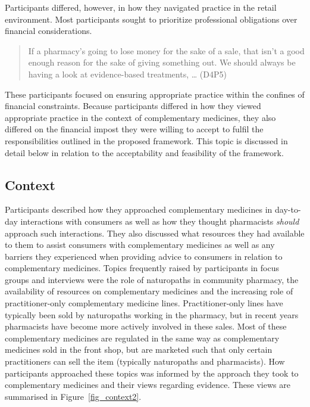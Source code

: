 \documentclass[11pt,a4paper]{article}
\begin{document}
Participants differed, however, in how they navigated practice in the
retail environment. Most participants sought to prioritize professional
obligations over financial considerations.

\begin{quote}
If a pharmacy's going to lose money for the sake of a sale, that isn't a
good enough reason for the sake of giving something out. We should
always be having a look at evidence-based treatments, \ldots{} (D4P5)
\end{quote}

These participants focused on ensuring appropriate practice within the
confines of financial constraints. Because participants differed in how
they viewed appropriate practice in the context of complementary
medicines, they also differed on the financial impost they were willing
to accept to fulfil the responsibilities outlined in the proposed
framework. This topic is discussed in detail below in relation to the
acceptability and feasibility of the framework.

\subsection{Context}\label{context}

Participants described how they approached complementary medicines in
day-to-day interactions with consumers as well as how they thought
pharmacists \emph{should} approach such interactions. They also
discussed what resources they had available to them to assist consumers
with complementary medicines as well as any barriers they experienced
when providing advice to consumers in relation to complementary
medicines. Topics frequently raised by participants in focus groups and
interviews were the role of naturopaths in community pharmacy, the
availability of resources on complementary medicines and the increasing
role of practitioner-only complementary medicine lines.
Practitioner-only lines have typically been sold by naturopaths working
in the pharmacy, but in recent years pharmacists have become more
actively involved in these sales. Most of these complementary medicines
are regulated in the same way as complementary medicines sold in the
front shop, but are marketed such that only certain practitioners can
sell the item (typically naturopaths and pharmacists). How participants
approached these topics was informed by the approach they took to
complementary medicines and their views regarding evidence. These views
are summarised in Figure~\ref{fig_context2}.
\end{document}
